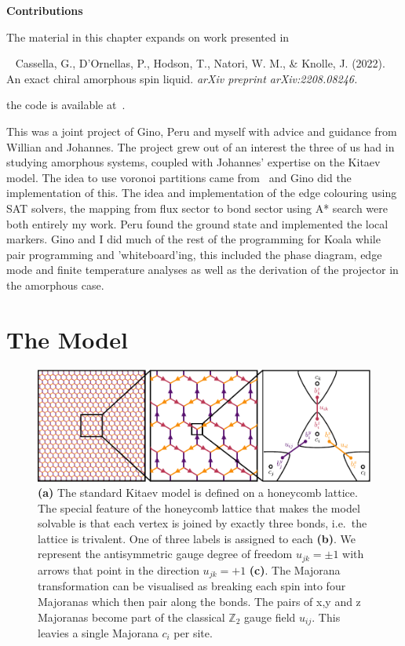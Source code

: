 \textbf{Contributions}

The material in this chapter expands on work presented in

~\autocite{cassellaExactChiralAmorphous2022} Cassella, G., D'Ornellas, P., Hodson, T., Natori, W. M., \& Knolle, J. (2022). An exact chiral amorphous spin liquid. \emph{arXiv preprint arXiv:2208.08246.}

the code is available at~\autocite{hodsonKoalaKitaevAmorphous2022}.

This was a joint project of Gino, Peru and myself with advice and guidance from Willian and Johannes. The project grew out of an interest the three of us had in studying amorphous systems, coupled with Johannes' expertise on the Kitaev model. The idea to use voronoi partitions came from~\autocite{marsalTopologicalWeaireThorpe2020} and Gino did the implementation of this. The idea and implementation of the edge colouring using SAT solvers, the mapping from flux sector to bond sector using A* search were both entirely my work. Peru found the ground state and implemented the local markers. Gino and I did much of the rest of the programming for Koala while pair programming and 'whiteboard'ing, this included the phase diagram, edge mode and finite temperature analyses as well as the derivation of the projector in the amorphous case.

\hypertarget{amk-Model}{%
\section{The Model}\label{amk-Model}}

\hypertarget{fig:intro_figure_by_hand}{%
\begin{figure}
\centering
\includegraphics[width=1\textwidth,height=\textheight]{figure_code/amk_chapter/intro/honeycomb_zoom/intro_figure_by_hand}
\caption[{The Kitaev Honeycomb Model}]{\textbf{(a)} The standard Kitaev model is defined on a honeycomb lattice. The special feature of the honeycomb lattice that makes the model solvable is that each vertex is joined by exactly three bonds, i.e.~the lattice is trivalent. One of three labels is assigned to each \textbf{(b)}. We represent the antisymmetric gauge degree of freedom \(u_{jk} = \pm 1\) with arrows that point in the direction \(u_{jk} = +1\) \textbf{(c)}. The Majorana transformation can be visualised as breaking each spin into four Majoranas which then pair along the bonds. The pairs of x,y and z Majoranas become part of the classical \(\mathbb{Z}_2\) gauge field \(u_{ij}\). This leavies a single Majorana \(c_i\) per site.}
\label{fig:intro_figure_by_hand}
\end{figure}
}

